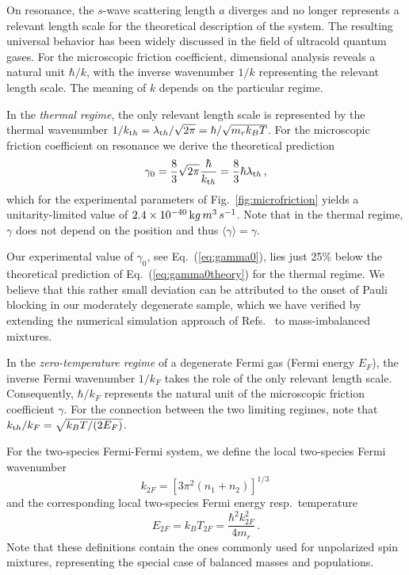 On resonance, the $s$-wave scattering length $a$ diverges and no longer represents a relevant length scale for the theoretical description of the system. The resulting universal behavior has been widely discussed in the field of ultracold quantum gases.
For the microscopic friction coefficient, dimensional analysis reveals a natural unit $\hbar/k$, with the inverse wavenumber $1/k$ representing the relevant length scale. The meaning of $k$ depends on the particular regime.

In the {\em thermal regime}, the only relevant length scale is represented by the thermal wavenumber $1/k_{\textrm th} = \lambda_{\textrm th}/\sqrt{2 \pi} = \hbar/\sqrt{m_r k_B T}$. For the microscopic friction coefficient on resonance we derive the theoretical prediction
\begin{equation}
\gamma_0 = \frac{8}{3} \sqrt{{2}{\pi}} \frac{\hbar}{k_{\textrm th}}
= \frac{8}{3} \hbar\lambda_{\textrm th} \, ,
\label{eq:gamma0theory}
\end{equation}
which for the experimental parameters of Fig.~\ref{fig:microfriction} yields a unitarity-limited value of $2.4 \times 10^{-40} \, {\textrm kg\,m^3\,s^{-1}}$. Note that in the thermal regime, $\gamma$ does not depend on the position and thus $\langle\gamma\rangle = \gamma$. 

Our experimental value of $\gamma_0$, see Eq.~(\ref{eq:gamma0}), lies just 25\% below the theoretical prediction of Eq.~(\ref{eq:gamma0theory}) for the thermal regime.
We believe that this rather small deviation can be attributed to the onset of Pauli blocking in our moderately degenerate sample, 
{which we have verified by extending the numerical simulation approach of Refs.~\cite{Lepers2010nso, Goulko2012bes} to mass-imbalanced mixtures.} 

In the {\em zero-temperature regime} of a degenerate Fermi gas (Fermi energy $E_F$), the inverse Fermi wavenumber $1/k_F$ takes the role of the only relevant length scale.
Consequently, $\hbar/k_F$ represents the natural unit of the microscopic friction coefficient $\gamma$. For the connection between the two limiting regimes, note that $k_{\textrm th}/k_F = \sqrt{k_B T/(2 E_F)}$.

For the two-species Fermi-Fermi system, we define %
\cite{Pini2021bmf} the local two-species Fermi wavenumber
\begin{equation}
{k}_{2F} = [3 \pi^2 (n_1 + n_2)]^{1/3} \, 
\label{eq:k2F}
\end{equation}
and the corresponding local two-species Fermi energy resp.\ temperature
\begin{equation}
{E}_{2F} = k_B T_{2F} = \frac{\hbar^2 {k}_{2F}^2}{4 m_r} \, .
\end{equation} 
Note that these definitions contain the ones commonly used for unpolarized spin mixtures, representing the special case of balanced masses and populations.


